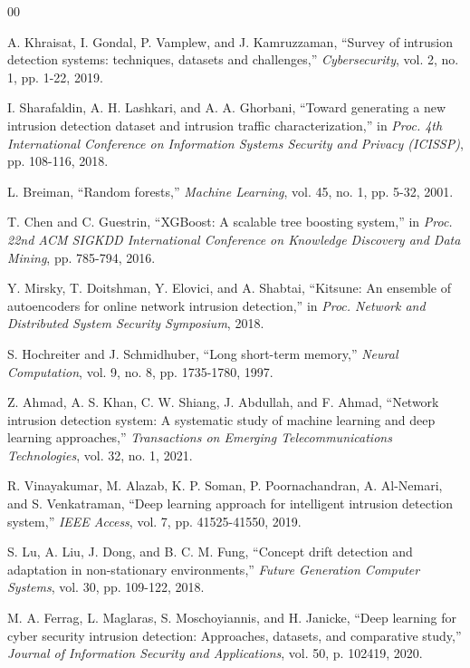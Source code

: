 \documentclass[conference]{IEEEtran}
\begin{document}
\begin{thebibliography}{00}

A. Khraisat, I. Gondal, P. Vamplew, and J. Kamruzzaman, ``Survey of intrusion detection systems: techniques, datasets and challenges,'' \textit{Cybersecurity}, vol. 2, no. 1, pp. 1-22, 2019.

I. Sharafaldin, A. H. Lashkari, and A. A. Ghorbani, ``Toward generating a new intrusion detection dataset and intrusion traffic characterization,'' in \textit{Proc. 4th International Conference on Information Systems Security and Privacy (ICISSP)}, pp. 108-116, 2018.

L. Breiman, ``Random forests,'' \textit{Machine Learning}, vol. 45, no. 1, pp. 5-32, 2001.

T. Chen and C. Guestrin, ``XGBoost: A scalable tree boosting system,'' in \textit{Proc. 22nd ACM SIGKDD International Conference on Knowledge Discovery and Data Mining}, pp. 785-794, 2016.

Y. Mirsky, T. Doitshman, Y. Elovici, and A. Shabtai, ``Kitsune: An ensemble of autoencoders for online network intrusion detection,'' in \textit{Proc. Network and Distributed System Security Symposium}, 2018.

S. Hochreiter and J. Schmidhuber, ``Long short-term memory,'' \textit{Neural Computation}, vol. 9, no. 8, pp. 1735-1780, 1997.

Z. Ahmad, A. S. Khan, C. W. Shiang, J. Abdullah, and F. Ahmad, ``Network intrusion detection system: A systematic study of machine learning and deep learning approaches,'' \textit{Transactions on Emerging Telecommunications Technologies}, vol. 32, no. 1, 2021.

R. Vinayakumar, M. Alazab, K. P. Soman, P. Poornachandran, A. Al-Nemari, and S. Venkatraman, ``Deep learning approach for intelligent intrusion detection system,'' \textit{IEEE Access}, vol. 7, pp. 41525-41550, 2019.

S. Lu, A. Liu, J. Dong, and B. C. M. Fung, ``Concept drift detection and adaptation in non-stationary environments,'' \textit{Future Generation Computer Systems}, vol. 30, pp. 109-122, 2018.

M. A. Ferrag, L. Maglaras, S. Moschoyiannis, and H. Janicke, ``Deep learning for cyber security intrusion detection: Approaches, datasets, and comparative study,'' \textit{Journal of Information Security and Applications}, vol. 50, p. 102419, 2020.


\end{thebibliography}
\end{document}
